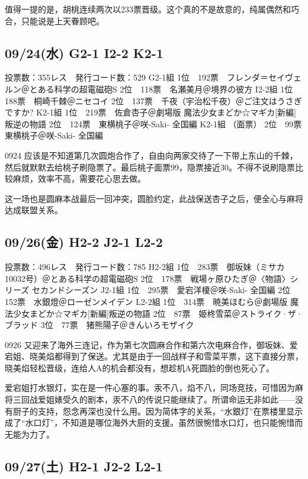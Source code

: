 值得一提的是，胡桃连续两次以233票晋级。这个真的不是故意的，纯属偶然和巧合，只能说是上天眷顾吧。

\subsection{09/24(水) G2-1 I2-2 K2-1}

    投票数：355レス　発行コード数：529
    G2-1組
    1位　192票　フレンダ＝セイヴェルン＠とある科学の超電磁砲S
    2位　118票　名瀬美月＠境界の彼方
    I2-2組
    1位　188票　桐崎千棘＠ニセコイ
    2位　137票　千夜（宇治松千夜）＠ご注文はうさぎですか?
    K2-1組
    1位　219票　佐倉杏子＠劇場版 魔法少女まどか☆マギカ[新編]叛逆の物語
    2位　124票　東横桃子＠咲-Saki- 全国編
    K2-1組 （面票）
    2位　99票　東横桃子＠咲-Saki- 全国編

0924 应该是不知道第几次圆炮合作了，自由向两家交待了一下带上东山的千棘，然后就默默去给桃子刷隐票了。最后桃子面票99，隐票接近30。不得不说刷隐票比较麻烦，效率不高，需要花心思去做。

这一场也是圆麻本战最后一回冲突，圆脸约定，此战保送杏子之后，便全心与麻将达成联盟关系。

\subsection{09/26(金) H2-2 J2-1 L2-2}

    投票数：496レス　発行コード数：785
    H2-2組
    1位　283票　御坂妹（ミサカ10032号）＠とある科学の超電磁砲S
    2位　178票　戦場ヶ原ひたぎ＠〈物語〉シリーズ セカンドシーズン
    J2-1組
    1位　295票　愛宕洋榎＠咲-Saki- 全国編
    2位　152票　水銀燈＠ローゼンメイデン
    L2-2組
    1位　314票　暁美ほむら＠劇場版 魔法少女まどか☆マギカ[新編]叛逆の物語
    2位　87票　姫柊雪菜＠ストライク·ザ·ブラッド
    3位　77票　猪熊陽子＠きんいろモザイク

0926 又迎来了海外三连记，作为第七次圆麻合作和第六次电麻合作，御坂妹、爱宕姐、晓美焰都得到了保送。尤其是由于一回战样子和雪菜平票，这下直接分票，晓美焰轻松晋级，连给人A的机会都没有，想趁机A死圆脸的倒也死心了。

爱宕姐打水银灯，实在是一件心塞的事。汞不八，焰不八，同场竞技，可惜因为麻将三回战爱姐婊受久的剧本，汞不八的传说只能继续了。所谓命运无非如此——没有厨子的支持，怨念再深也没什么用。因为简体字的关系，“水銀灯”在票楼里显示成了“水口灯”，不知道是哪位海外大厨的支援。虽然很惋惜水口灯，也只能惋惜而无能为力了。

\subsection{09/27(土) H2-1 J2-2 L2-1}

